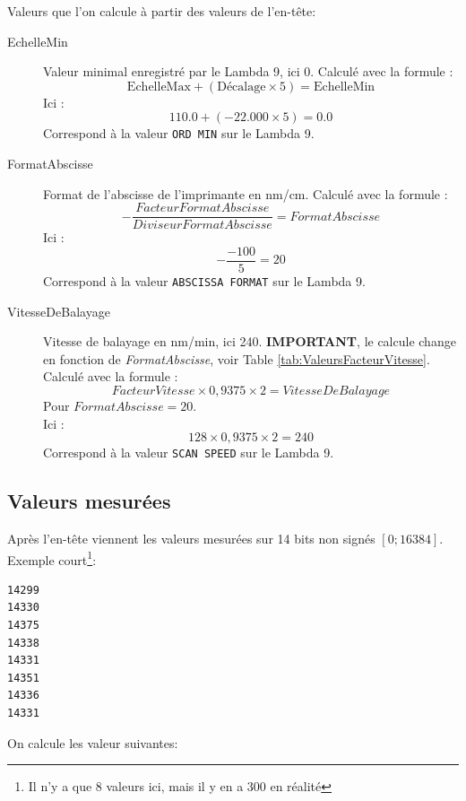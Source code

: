 \documentclass[a4paper, 12pt]{article}
\begin{document}
Valeurs que l'on calcule à partir des valeurs de l'en-tête:

\begin{description}
	\item[EchelleMin] Valeur minimal enregistré par le Lambda 9, ici 0.
		Calculé avec la formule : 
		$$ \text{EchelleMax} + ( \text{Décalage} \times 5 ) = \text{EchelleMin}$$
		Ici :
		$$110.0 + ( -22.000 \times 5 ) = 0.0$$ 
		Correspond à la valeur \verb|ORD MIN| sur le Lambda 9.

	\item[FormatAbscisse] Format de l'abscisse de l'imprimante en nm/cm. 
		Calculé avec la formule : 
		$$ { - \frac{FacteurFormatAbscisse}{DiviseurFormatAbscisse} } = FormatAbscisse $$ 
		Ici :
		$$ - \frac{-100}{5} = 20$$ 
		Correspond à la valeur \verb|ABSCISSA FORMAT| sur le Lambda 9.

	\item[VitesseDeBalayage] Vitesse de balayage en nm/min, ici 240. 
		\textbf{IMPORTANT}, le calcule change en fonction de \emph{FormatAbscisse}, voir Table \ref{tab:ValeursFacteurVitesse}.
		Calculé avec la formule : 
		$$FacteurVitesse \times 0,9375 \times 2 = VitesseDeBalayage$$
		Pour $ FormatAbscisse = 20 $.
		\\
		Ici :
		$$128 \times 0,9375 \times 2 = 240$$ 
		Correspond à la valeur \verb|SCAN SPEED| sur le Lambda 9.



\end{description}


\subsection{Valeurs mesurées}\label{valeurs}

Après l'en-tête viennent les valeurs mesurées sur 14 bits non signés $[0;16384]$. 
Exemple court\footnote{Il n'y a que 8 valeurs ici, mais il y en a 300 en réalité}:  

\begin{lstlisting}
14299
14330
14375
14338
14331
14351
14336
14331
\end{lstlisting}

On calcule les valeur suivantes: 
\end{document}
